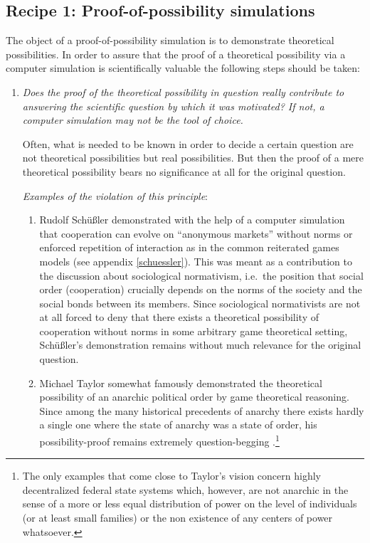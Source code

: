 \subsection{Recipe 1: Proof-of-possibility simulations}

The object of a proof-of-possibility simulation is to demonstrate theoretical
possibilities. In order to assure that the proof of a theoretical possibility
via a computer simulation is scientifically valuable the following steps
should be taken:

\begin{enumerate}
\item {\em Does the proof of the theoretical possibility in question really
    contribute to answering the scientific question by which it was motivated?
    If not, a computer simulation may not be the tool of choice.}

  Often, what is needed to be known in order to decide a certain question are
  not theoretical possibilities but real possibilities. But then the proof of
  a mere theoretical possibility bears no significance at all for the original
  question.

{\em Examples of the violation of this principle}:

\begin{enumerate}
\item Rudolf Schüßler demonstrated with the help of a computer simulation that
  cooperation can evolve on ``anonymous markets'' without norms or enforced
  repetition of interaction as in the common reiterated games models (see
  appendix \ref{schuessler}). This was meant as a contribution to the
  discussion about sociological normativism, i.e.\ the position that social
  order (cooperation) crucially depends on the norms of the society and the
  social bonds between its members. Since sociological normativists are not at
  all forced to deny that there exists a theoretical possibility of
  cooperation without norms in some arbitrary game theoretical setting,
  Schüßler's demonstration remains without much relevance for the original
  question.

\item Michael Taylor somewhat famously demonstrated the theoretical
possibility of an anarchic political order by game theoretical reasoning.
Since among the many historical precedents of anarchy there exists hardly a
single one where the state of anarchy was a state of order, his
possibility-proof remains extremely question-begging \cite[]{taylor:1987}.\footnote{The only examples that come close to Taylor's vision concern highly decentralized federal state systems which, however, are not anarchic in the sense of a more or less equal distribution of power on the level of individuals (or at least small families) or the non existence of any centers of power whatsoever.}


\end{enumerate}
\end{enumerate}
